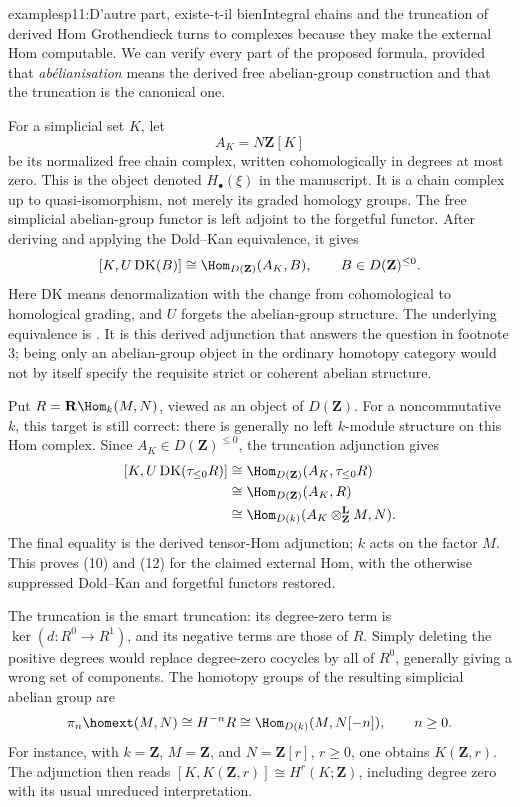 \begin{dcomment}{examples}{p11:D’autre part, existe-t-il bien}{Integral chains and the truncation of derived Hom}
Grothendieck turns to complexes because they make the external Hom computable. We can verify every part of the proposed formula, provided that \emph{abélianisation} means the derived free abelian-group construction and that the truncation is the canonical one.

For a simplicial set \(K\), let
\[
 A_K=N\mathbf Z[K]
\]
be its normalized free chain complex, written cohomologically in degrees at most zero. This is the object denoted \(H_\bullet(\xi)\) in the manuscript. It is a chain complex up to quasi-isomorphism, not merely its graded homology groups. The free simplicial abelian-group functor is left adjoint to the forgetful functor. After deriving and applying the Dold--Kan equivalence, it gives
\[
 [K,U\,\mathrm{DK}(B)]
 \cong
 \Hom_{D(\mathbf Z)}(A_K,B),
 \qquad B\in D(\mathbf Z)^{\leq0}.
\]
Here \(\mathrm{DK}\) means denormalization with the change from cohomological to homological grading, and \(U\) forgets the abelian-group structure. The underlying equivalence is \citet[Theorem 14.24.3]{StacksDoldKan}. It is this derived adjunction that answers the question in footnote 3; being only an abelian-group object in the ordinary homotopy category would not by itself specify the requisite strict or coherent abelian structure.

Put \(R=\mathbf R\Hom_k(M,N)\), viewed as an object of \(D(\mathbf Z)\). For a noncommutative \(k\), this target is still correct: there is generally no left \(k\)-module structure on this Hom complex. Since \(A_K\in D(\mathbf Z)^{\leq0}\), the truncation adjunction gives
\[
\begin{aligned}
 {}[K,U\,\mathrm{DK}(\tau_{\leq0}R)]
 &\cong\Hom_{D(\mathbf Z)}(A_K,\tau_{\leq0}R)\\
 &\cong\Hom_{D(\mathbf Z)}(A_K,R)\\
 &\cong\Hom_{D(k)}(A_K\otimes_{\mathbf Z}^{\mathbf L}M,N).
\end{aligned}
\]
The final equality is the derived tensor-Hom adjunction; \(k\) acts on the factor \(M\). This proves (10) and (12) for the claimed external Hom, with the otherwise suppressed Dold--Kan and forgetful functors restored.

The truncation is the smart truncation: its degree-zero term is \(\ker(d:R^0\to R^1)\), and its negative terms are those of \(R\). Simply deleting the positive degrees would replace degree-zero cocycles by all of \(R^0\), generally giving a wrong set of components. The homotopy groups of the resulting simplicial abelian group are
\[
 \pi_n\homext(M,N)
 \cong H^{-n}R
 \cong\Hom_{D(k)}(M,N[-n]),\qquad n\geq0.
\]
For instance, with \(k=\mathbf Z\), \(M=\mathbf Z\), and \(N=\mathbf Z[r]\), \(r\geq0\), one obtains \(K(\mathbf Z,r)\). The adjunction then reads
\([K,K(\mathbf Z,r)]\cong H^r(K;\mathbf Z)\), including degree zero with its usual unreduced interpretation.


\end{dcomment}
